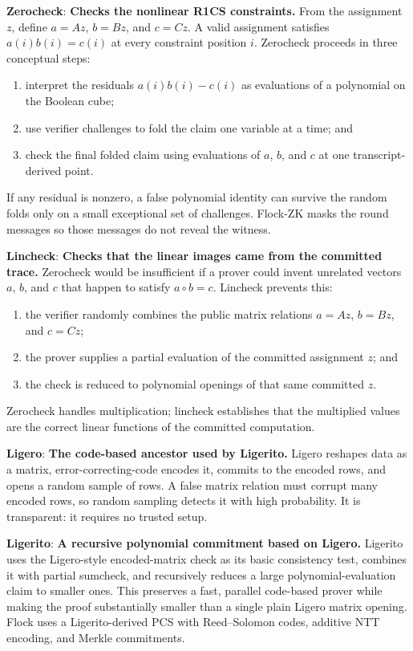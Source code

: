 \documentclass[11pt]{article}
\newcommand{\term}[2]{\textbf{#1}: \textbf{#2}}
\begin{document}
\term{Zerocheck}{Checks the nonlinear R1CS constraints.}
From the assignment $z$, define $a=Az$, $b=Bz$, and $c=Cz$. A valid assignment
satisfies $a(i)b(i)=c(i)$ at every constraint position $i$. Zerocheck proceeds
in three conceptual steps:
\begin{enumerate}
\item interpret the residuals $a(i)b(i)-c(i)$ as evaluations of a polynomial
      on the Boolean cube;
\item use verifier challenges to fold the claim one variable at a time; and
\item check the final folded claim using evaluations of $a$, $b$, and $c$ at
      one transcript-derived point.
\end{enumerate}
If any residual is nonzero, a false polynomial identity can survive the random
folds only on a small exceptional set of challenges. Flock-ZK masks the round
messages so those messages do not reveal the witness.

\term{Lincheck}{Checks that the linear images came from the committed trace.}
Zerocheck would be insufficient if a prover could invent unrelated vectors
$a$, $b$, and $c$ that happen to satisfy $a\circ b=c$. Lincheck prevents this:
\begin{enumerate}
\item the verifier randomly combines the public matrix relations
      $a=Az$, $b=Bz$, and $c=Cz$;
\item the prover supplies a partial evaluation of the committed assignment
      $z$; and
\item the check is reduced to polynomial openings of that same committed $z$.
\end{enumerate}
Zerocheck handles multiplication; lincheck establishes that the multiplied
values are the correct linear functions of the committed computation.

\term{Ligero}{The code-based ancestor used by Ligerito.}
Ligero reshapes data as a matrix, error-correcting-code encodes it, commits to
the encoded rows, and opens a random sample of rows. A false matrix relation
must corrupt many encoded rows, so random sampling detects it with high
probability. It is transparent: it requires no trusted setup.

\term{Ligerito}{A recursive polynomial commitment based on Ligero.}
Ligerito uses the Ligero-style encoded-matrix check as its basic consistency
test, combines it with partial sumcheck, and recursively reduces a large
polynomial-evaluation claim to smaller ones. This preserves a fast,
parallel code-based prover while making the proof substantially smaller than a
single plain Ligero matrix opening. Flock uses a Ligerito-derived PCS with
Reed--Solomon codes, additive NTT encoding, and Merkle commitments.
\end{document}
